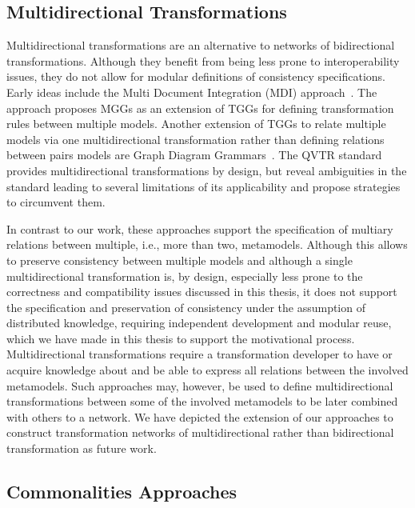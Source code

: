 \subsection{Multidirectional Transformations}

Multidirectional transformations are an alternative to networks of bidirectional transformations.
Although they benefit from being less prone to interoperability issues, they do not allow for modular definitions of consistency specifications.
Early ideas include the Multi Document Integration (MDI) approach~\cite{koenigs2006MGGs-SoSym}. The approach proposes \glspl{MGG} as an extension of \glspl{TGG} for defining transformation rules between multiple models.
Another extension of \glspl{TGG} to relate multiple models via one multidirectional transformation rather than defining relations between pairs models are Graph Diagram Grammars~\cite{trollmann2015TransformationTGGtoMultiModel-ICMT, trollmann2016SynchronizationTGGtoMultiModel-ICMT}.
The \gls{QVTR} standard~\cite{qvt} provides multidirectional transformations by design, but \textcite{macedo2014FrameworkMultiDirectional-BX} reveal ambiguities in the standard leading to several limitations of its applicability  and propose strategies to circumvent them.

In contrast to our work, these approaches support the specification of multiary relations between multiple, i.e., more than two, metamodels.
Although this allows to preserve consistency between multiple models and although a single multidirectional transformation is, by design, especially less prone to the correctness and compatibility issues discussed in this thesis, it does not support the specification and preservation of consistency under the assumption of distributed knowledge, requiring independent development and modular reuse, which we have made in this thesis to support the motivational process.
Multidirectional transformations require a transformation developer to have or acquire knowledge about and be able to express all relations between the involved metamodels.
Such approaches may, however, be used to define multidirectional transformations between some of the involved metamodels to be later combined with others to a network.
We have depicted the extension of our approaches to construct transformation networks of multidirectional rather than bidirectional transformation as future work.


\subsection{Commonalities Approaches}


